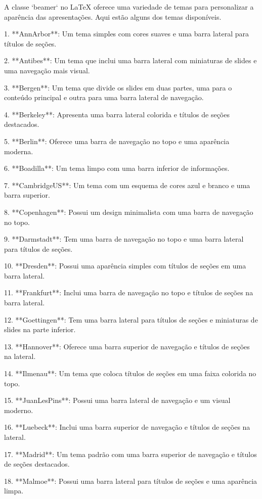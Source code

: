 \usepackage{enumitem}

A classe `beamer` no LaTeX oferece uma variedade de temas para personalizar a aparência das apresentações. Aqui estão alguns dos temas disponíveis.

1. **AnnArbor**: Um tema simples com cores suaves e uma barra lateral para títulos de seções.

2. **Antibes**: Um tema que inclui uma barra lateral com miniaturas de slides e uma navegação mais visual.

3. **Bergen**: Um tema que divide os slides em duas partes, uma para o conteúdo principal e outra para uma barra lateral de navegação.

4. **Berkeley**: Apresenta uma barra lateral colorida e títulos de seções destacados.

5. **Berlin**: Oferece uma barra de navegação no topo e uma aparência moderna.

6. **Boadilla**: Um tema limpo com uma barra inferior de informações.

7. **CambridgeUS**: Um tema com um esquema de cores azul e branco e uma barra superior.

8. **Copenhagen**: Possui um design minimalista com uma barra de navegação no topo.

9. **Darmstadt**: Tem uma barra de navegação no topo e uma barra lateral para títulos de seções.

10. **Dresden**: Possui uma aparência simples com títulos de seções em uma barra lateral.

11. **Frankfurt**: Inclui uma barra de navegação no topo e títulos de seções na barra lateral.

12. **Goettingen**: Tem uma barra lateral para títulos de seções e miniaturas de slides na parte inferior.

13. **Hannover**: Oferece uma barra superior de navegação e títulos de seções na lateral.

14. **Ilmenau**: Um tema que coloca títulos de seções em uma faixa colorida no topo.

15. **JuanLesPins**: Possui uma barra lateral de navegação e um visual moderno.

16. **Luebeck**: Inclui uma barra superior de navegação e títulos de seções na lateral.

17. **Madrid**: Um tema padrão com uma barra superior de navegação e títulos de seções destacados.

18. **Malmoe**: Possui uma barra lateral para títulos de seções e uma aparência limpa.

